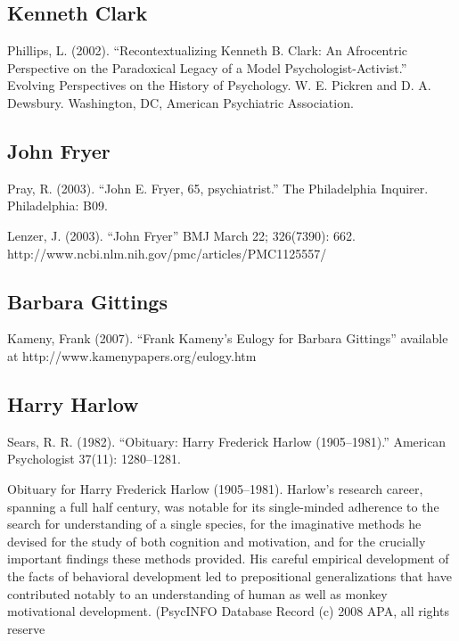 \subsection{Kenneth Clark}
\label{kennethclark}

Phillips, L. (2002). ``Recontextualizing Kenneth B. Clark: An Afrocentric Perspective on the Paradoxical Legacy of a Model Psychologist-Activist.'' Evolving Perspectives on the History of Psychology. W. E. Pickren and D. A. Dewsbury. Washington, DC, American Psychiatric Association. 

\subsection{John Fryer}
\label{johnfryer}

Pray, R. (2003). ``John E. Fryer, 65, psychiatrist.'' The Philadelphia Inquirer. Philadelphia: B09.

Lenzer, J. (2003). ``John Fryer'' BMJ March 22; 326(7390): 662. http:\slash \slash www.ncbi.nlm.nih.gov\slash pmc\slash articles\slash PMC1125557\slash  

\subsection{Barbara Gittings}
\label{barbaragittings}

Kameny, Frank (2007). ``Frank Kameny's Eulogy for Barbara Gittings'' available at http:\slash \slash www.kamenypapers.org\slash eulogy.htm

\subsection{Harry Harlow}
\label{harryharlow}

Sears, R. R. (1982). ``Obituary: Harry Frederick Harlow (1905--1981).'' American Psychologist 37(11): 1280--1281. 

Obituary for Harry Frederick Harlow (1905--1981). Harlow's research career, spanning a full half century, was notable for its single-minded adherence to the search for understanding of a single species, for the imaginative methods he devised for the study of both cognition and motivation, and for the crucially important findings these methods provided. His careful empirical development of the facts of behavioral development led to prepositional generalizations that have contributed notably to an understanding of human as well as monkey motivational development. (PsycINFO Database Record (c) 2008 APA, all rights reserve 

